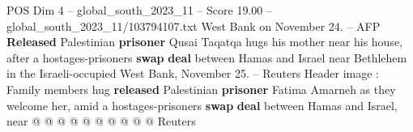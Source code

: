 \begin{textsample}{POS Dim 4 – global\_south\_2023\_11 – Score 19.00 – global\_south\_2023\_11/103794107.txt}
West Bank on November 24. -- AFP \textbf{Released} Palestinian \textbf{prisoner} Qusai Taqatqa hugs his mother near his house, after a hostages-prisoners \textbf{swap} \textbf{deal} between Hamas and Israel near Bethlehem in the Israeli-occupied West Bank, November 25. -- Reuters Header image : Family members hug \textbf{released} Palestinian \textbf{prisoner} Fatima Amarneh as they welcome her, amid a hostages-prisoners \textbf{swap} \textbf{deal} between Hamas and Israel, near @ @ @ @ @ @ @ @ @ @ Reuters

\end{textsample}
